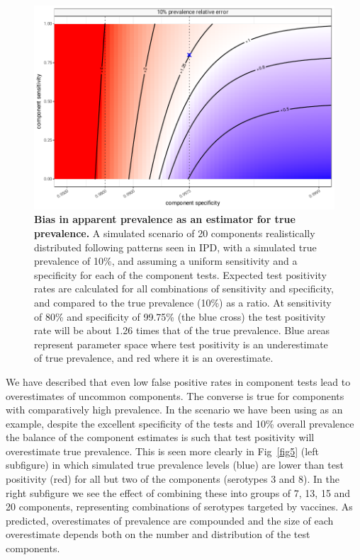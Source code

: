 \documentclass[10pt,letterpaper]{article}
\begin{document}
\begin{figure}[h!]
\centerline{\includegraphics{fig/impact-error-by-sensitivity-specificity.pdf}}
\caption{{\bf Bias in apparent prevalence as an estimator for true prevalence.}
A simulated scenario of 20 components realistically distributed following patterns seen in IPD, with a simulated true prevalence of 10\%, and assuming a uniform sensitivity and a specificity for each of the component tests. Expected test positivity rates are calculated for all combinations of sensitivity and specificity, and compared to the true prevalence (10\%) as a ratio. At sensitivity of 80\% and specificity of 99.75\% (the blue cross) the test positivity rate will be about 1.26 times that of the true prevalence. Blue areas represent parameter space where test positivity is an underestimate of true prevalence, and red where it is an overestimate.}
\label{fig4}
\end{figure}

We have described that even low false positive rates in component tests lead to overestimates of uncommon components. The converse is true for components with comparatively high prevalence. In the scenario we have been using as an example, despite the excellent specificity of the tests and 10\% overall prevalence the balance of the component estimates is such that test positivity will overestimate true prevalence. This is seen more clearly in Fig~\ref{fig5} (left subfigure) in which simulated true prevalence levels (blue) are lower than test positivity (red) for all but two of the components (serotypes 3 and 8). In the right subfigure we see the effect of combining these into groups of 7, 13, 15 and 20 components, representing combinations of serotypes targeted by vaccines. As predicted, overestimates of prevalence are compounded and the size of each overestimate depends both on the number and distribution of the test components.
\end{document}
